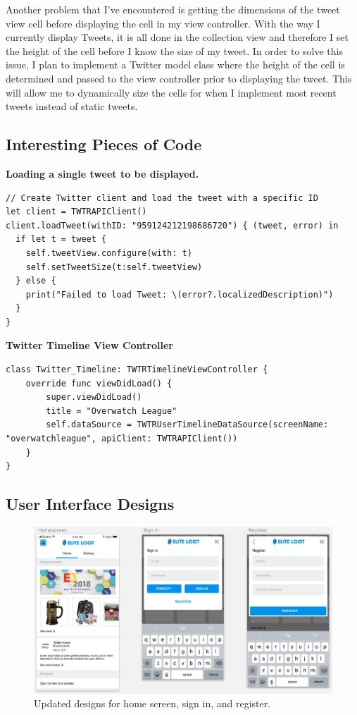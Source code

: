 \documentclass[onecolumn, draftclsnofoot,10pt, compsoc]{IEEEtran}
\begin{document}
\noindent Another problem that I’ve encountered is getting the dimensions of the tweet view cell before displaying the cell in my view controller. With the way I currently display Tweets, it is all done in the collection view and therefore I set the height of the cell before I know the size of my tweet. In order to solve this issue, I plan to implement a Twitter model class where the height of the cell is determined and passed to the view controller prior to displaying the tweet. This will allow me to dynamically size the cells for when I implement most recent tweets instead of static tweets. 
\subsection{Interesting Pieces of Code}
\noindent\textbf{Loading a single tweet to be displayed.}
\begin{lstlisting}
// Create Twitter client and load the tweet with a specific ID
let client = TWTRAPIClient()
client.loadTweet(withID: "959124212198686720") { (tweet, error) in
  if let t = tweet {
    self.tweetView.configure(with: t)
    self.setTweetSize(t:self.tweetView)
  } else {
    print("Failed to load Tweet: \(error?.localizedDescription)")
  }
}
\end{lstlisting}
\noindent\textbf{Twitter Timeline View Controller}
\begin{lstlisting}
class Twitter_Timeline: TWTRTimelineViewController {
    override func viewDidLoad() {
        super.viewDidLoad()
        title = "Overwatch League"
        self.dataSource = TWTRUserTimelineDataSource(screenName: 
"overwatchleague", apiClient: TWTRAPIClient())
    }
}
\end{lstlisting}

\subsection{User Interface Designs}
\begin{figure}[H]
\centering
\captionsetup{justification=centering}
\includegraphics[scale=.50]{homescreen}
\caption{Updated designs for home screen, sign in, and register.}
\end{figure}
\end{document}
